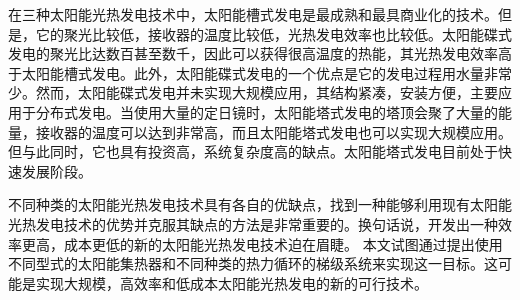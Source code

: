 在三种太阳能光热发电技术中，太阳能槽式发电是最成熟和最具商业化的技术。但是，它的聚光比较低，接收器的温度比较低，光热发电效率也比较低。太阳能碟式发电的聚光比达数百甚至数千，因此可以获得很高温度的热能，其光热发电效率高于太阳能槽式发电。此外，太阳能碟式发电的一个优点是它的发电过程用水量非常少。然而，太阳能碟式发电并未实现大规模应用，其结构紧凑，安装方便，主要应用于分布式发电。当使用大量的定日镜时，太阳能塔式发电的塔顶会聚了大量的能量，接收器的温度可以达到非常高，而且太阳能塔式发电也可以实现大规模应用。但与此同时，它也具有投资高，系统复杂度高的缺点。太阳能塔式发电目前处于快速发展阶段。

不同种类的太阳能光热发电技术具有各自的优缺点，找到一种能够利用现有太阳能光热发电技术的优势并克服其缺点的方法是非常重要的。换句话说，开发出一种效率更高，成本更低的新的太阳能光热发电技术迫在眉睫。
本文试图通过提出使用不同型式的太阳能集热器和不同种类的热力循环的梯级系统来实现这一目标。这可能是实现大规模，高效率和低成本太阳能光热发电的新的可行技术。

